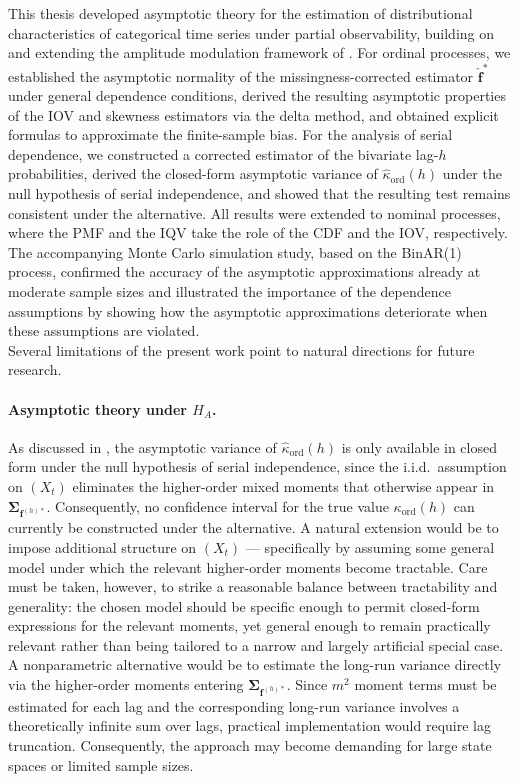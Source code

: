 ﻿\documentclass[12pt,a4paper]{scrreprt}
\theoremstyle{definition}
\begin{document}
This thesis developed asymptotic theory for the estimation of 
distributional characteristics of categorical time series under 
partial observability, building on and extending the amplitude 
modulation framework of \citet{weiss2021categorical}. For ordinal 
processes, we established the asymptotic normality of the 
missingness-corrected estimator $\hat{\boldsymbol{f}}^*$ under 
general dependence conditions, derived the resulting 
asymptotic properties of the IOV and skewness estimators via the 
delta method, and obtained explicit formulas to approximate the finite-sample bias. 
For the analysis of serial dependence, we constructed a 
corrected estimator of the bivariate lag-$h$ probabilities, derived 
the closed-form asymptotic variance of $\hat{\kappa}_{\mathrm{ord}}(h)$ 
under the null hypothesis of serial independence, and showed that the 
resulting test remains consistent under the alternative. All results 
were extended to nominal processes, where the PMF and the IQV take 
the role of the CDF and the IOV, respectively. The accompanying Monte 
Carlo simulation study, based on the BinAR(1) process, confirmed the 
accuracy of the asymptotic approximations already at moderate sample 
sizes and illustrated the importance of the dependence assumptions by showing 
how the asymptotic approximations deteriorate when these assumptions 
are violated. \\
Several limitations of the present work point to natural directions 
for future research.

\paragraph{Asymptotic theory under $H_A$.} As discussed in 
, the asymptotic variance of 
$\hat{\kappa}_{\mathrm{ord}}(h)$ is only available in closed form 
under the null hypothesis of serial independence, since the i.i.d.\ 
assumption on $(X_t)$ eliminates the higher-order mixed moments that 
otherwise appear in $\boldsymbol{\Sigma}_{\boldsymbol{f}^{(h)*}}$. 
Consequently, no confidence interval for the true value 
$\kappa_{\mathrm{ord}}(h)$ can currently be constructed under the 
alternative. A natural extension would be to impose additional 
structure on $(X_t)$ --- specifically by assuming some general model 
under which the relevant higher-order moments become tractable.  Care 
must be taken, however, to strike a reasonable balance between 
tractability and generality: the chosen model should be specific 
enough to permit closed-form expressions for the relevant moments, 
yet general enough to remain practically relevant rather than being 
tailored to a narrow and largely artificial special case. A nonparametric
alternative would be to estimate the long-run variance directly via the 
higher-order moments entering $\boldsymbol{\Sigma}_{\boldsymbol{f}^{(h)*}}$.
Since $m^2$ moment terms must be estimated for each lag and the corresponding 
long-run variance involves a theoretically infinite sum over lags, practical 
implementation would require lag truncation. Consequently, the approach may 
become demanding for large state spaces or limited sample sizes.
\end{document}
